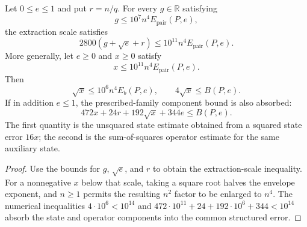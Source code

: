 \begin{theorem}
\label{thm:pauli-final-component-absorption}
\leanok
{}
Let $0\leq e\leq1$ and put $r=n/q$.  For every $g\in\mathbb R$ satisfying
\[
 g\leq10^7n^4E_{\mathrm{pair}}(P,e),
\]
the extraction scale satisfies
\[
 2800(g+\sqrt e+r)\leq10^{11}n^4E_{\mathrm{pair}}(P,e).
\]
More generally, let $e\geq0$ and $x\geq0$ satisfy
\[
 x\leq10^{11}n^4E_{\mathrm{pair}}(P,e).
\]
Then
\[
 \sqrt{x}\leq10^6n^4E_b(P,e),\qquad
 4\sqrt{x}\leq B(P,e).
\]
If in addition $e\leq1$, the prescribed-family component bound is also
absorbed:
\[
 472x+24r+192\sqrt{x}+344e\leq B(P,e).
\]
The first quantity is the unsquared state estimate obtained from a squared
state error $16x$; the second is the sum-of-squares operator estimate for the
same auxiliary state.
\end{theorem}
\begin{proof}
\leanok
{}
Use the bounds for $g$, $\sqrt e$, and $r$ to obtain the extraction-scale
inequality.  For a nonnegative $x$ below that scale, taking a square root
halves the envelope exponent, and $n\geq1$ permits the resulting $n^2$ factor
to be enlarged to $n^4$.  The numerical inequalities
$4\cdot10^6<10^{14}$ and
$472\cdot10^{11}+24+192\cdot10^6+344<10^{14}$ absorb the state and operator
components into the common structured error.
\end{proof}

